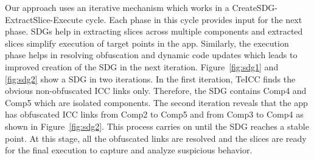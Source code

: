 Our approach uses an iterative mechanism which works in a CreateSDG-ExtractSlice-Execute cycle. Each phase in this cycle provides input for the next phase. SDGs help in extracting slices across multiple components and extracted slices simplify execution of target points in the app. Similarly, the execution phase helps in resolving obfuscation and dynamic code updates which leads to improved creation of the SDG in the next iteration. Figure~\ref{fig:sdg1} and \ref{fig:sdg2} show a SDG in two iterations. In the first iteration, TeICC finds the obvious non-obfuscated ICC links only. Therefore, the SDG contains Comp4 and Comp5 which are isolated components. The second iteration reveals that the app has obfuscated ICC links from Comp2 to Comp5 and from Comp3 to Comp4 as shown in Figure~\ref{fig:sdg2}. This process carries on until the SDG reaches a stable point. At this stage, all the obfuscated links are resolved and the slices are ready for the final execution to capture and analyze suspicious behavior.




